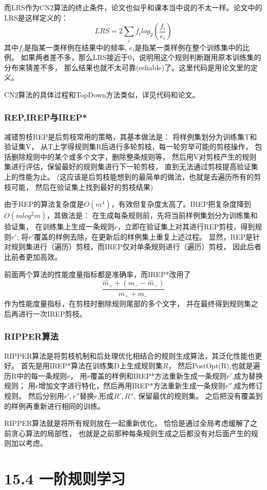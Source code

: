 \documentclass[UTF8]{article}
\begin{document}
    而LRS作为CN2算法的终止条件，论文也似乎和课本当中说的不太一样。论文中的LRS是这样定义的：
    \begin{equation}
        LRS = 2\sum_i f_i log_2(\dfrac{f_i}{e_i})
    \end{equation}
    其中$f_i$是指某一类样例在结果中的频率, $e_i$是指某一类样例在整个训练集中的比例。
    如果两者差不多，那么LRS接近于0，说明用这个规则判断跟用原本训练集的分布来猜差不多，
    那么结果也就不太可靠(reliable)了。这里代码是用论文里的定义。

    CN2算法的具体过程和TopDown方法类似，详见代码和论文。

\subsubsection{REP,IREP与IREP*}
    减错剪枝REP是后剪枝常用的策略，其基本做法是：
    将样例集划分为训练集T和验证集V，
    从T上学得规则集R后进行多轮剪枝，每一轮穷举可能的剪枝操作，
    包括删除规则中的某个或多个文字，删除整条规则等，
    然后用V对剪枝产生的规则集进行评估，保留最好的规则集进行下一轮剪枝，
    直到无法通过剪枝提高验证集上的性能为止。
    (这应该是后剪枝能想到的最简单的做法，也就是去遍历所有的剪枝可能，
    然后在验证集上找到最好的剪枝结果)

    由于REP的算法复杂度是$O(m^4)$，有效但复杂度太高了。IREP把复杂度降到$O(mlog^2m)$，其做法是：
    在生成每条规则前，先将当前样例集划分为训练集和验证集，
    在训练集上生成一条规则$r$，立即在验证集上对其进行REP剪枝，得到规则$r'$;
    将$r'$覆盖的样例去除，在更新后的样例集上重复上述过程。
    显然，REP是针对规则集进行（遍历）剪枝，而IREP仅对单条规则进行（遍历）剪枝，
    因此后者比前者更加高效。

    前面两个算法的性能度量指标都是准确率，而IREP*改用了
    $$\dfrac{\hat{m}_++(m_--\hat{m}_-)}{m_++m_-}$$
    作为性能度量指标，在剪枝时删除规则尾部的多个文字，
    并在最终得到规则集之后再进行一次IREP剪枝。

\subsubsection{RIPPER算法}
    RIPPER算法是将剪枝机制和后处理优化相结合的规则生成算法，其泛化性能也更好。
    首先是用IREP*算法在训练集D上生成规则集$R$，
    然后PostOpt(R),也就是遍历R中的每一条规则$r$，
    用$r$覆盖的样例和IREP*方法重新生成一条规则$r'$,成为替换规则；
    用$r$增加文字进行特化，然后再用IREP*方法重新生成一条规则$r''$,成为修订规则。
    然后分别用$r',r''$替换$r$,形成$R',R''$, 保留最优的规则集。
    之后把没有覆盖到的样例再重新进行相同的训练。

    RIPPER算法就是将所有规则放在一起重新优化，
    恰恰是通过全局考虑缓解了之前贪心算法的局部性，
    也就是之前那种每条规则生成之后都没有对后面产生的规则加以考虑。

\section{15.4 一阶规则学习}
\end{document}
